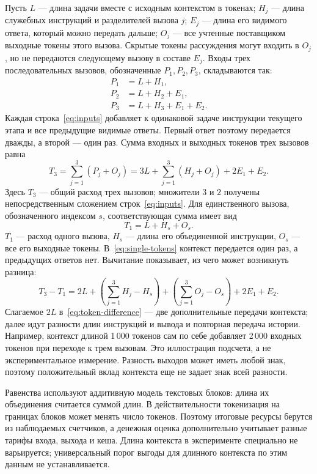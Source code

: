 Пусть $L$ --- длина задачи вместе с исходным контекстом в токенах; $H_j$ --- длина служебных инструкций и разделителей вызова $j$; $E_j$ --- длина его видимого ответа, который можно передать дальше; $O_j$ --- все учтенные поставщиком выходные токены этого вызова. Скрытые токены рассуждения могут входить в $O_j$, но не передаются следующему вызову в составе $E_j$. Входы трех последовательных вызовов, обозначенные $P_1,P_2,P_3$, складываются так:
\begin{align}
P_1&=L+H_1,\nonumber\\
P_2&=L+H_2+E_1,\nonumber\\
P_3&=L+H_3+E_1+E_2.
\label{eq:inputs}
\end{align}
Каждая строка~\eqref{eq:inputs} добавляет к одинаковой задаче инструкции текущего этапа и все предыдущие видимые ответы. Первый ответ поэтому передается дважды, а второй --- один раз. Сумма входных и выходных токенов трех вызовов равна
\begin{equation}
T_3=\sum_{j=1}^{3}(P_j+O_j)
=3L+\sum_{j=1}^{3}(H_j+O_j)+2E_1+E_2.
\label{eq:three-tokens}
\end{equation}
Здесь $T_3$ --- общий расход трех вызовов; множители $3$ и $2$ получены непосредственным сложением строк~\eqref{eq:inputs}. Для единственного вызова, обозначенного индексом $s$, соответствующая сумма имеет вид
\begin{equation}
T_1=L+H_s+O_s.
\label{eq:single-tokens}
\end{equation}
$T_1$ --- расход одного вызова, $H_s$ --- длина его объединенной инструкции, $O_s$ --- все его выходные токены. В~\eqref{eq:single-tokens} контекст передается один раз, а предыдущих ответов нет. Вычитание показывает, из чего может возникнуть разница:
\begin{equation}
T_3-T_1=2L+\left(\sum_{j=1}^{3}H_j-H_s\right)
+\left(\sum_{j=1}^{3}O_j-O_s\right)+2E_1+E_2.
\label{eq:token-difference}
\end{equation}
Слагаемое $2L$ в~\eqref{eq:token-difference} --- две дополнительные передачи контекста; далее идут разности длин инструкций и вывода и повторная передача истории. Например, контекст длиной 1\,000 токенов сам по себе добавляет 2\,000 входных токенов при переходе к трем вызовам. Это иллюстрация подсчета, а не экспериментальное измерение. Разность выходов может иметь любой знак, поэтому положительный вклад контекста еще не задает знак всей разности.

Равенства используют аддитивную модель текстовых блоков: длина их объединения считается суммой длин. В действительности токенизация на границах блоков может менять число токенов. Поэтому итоговые ресурсы берутся из наблюдаемых счетчиков, а денежная оценка дополнительно учитывает разные тарифы входа, выхода и кеша. Длина контекста в эксперименте специально не варьируется; универсальный порог выгоды для длинного контекста по этим данным не устанавливается.

